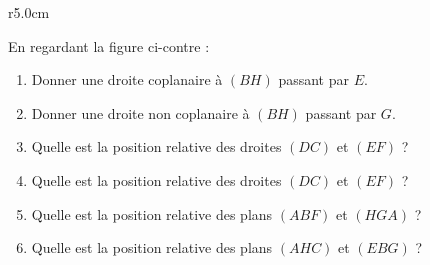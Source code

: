 
\begin{exercice}\label{exosmath-0079}

\begin{wrapfigure}{r}{5.0cm}
    \vspace{-0.5cm}
                \centering
                    
                \end{wrapfigure}

                En regardant la figure ci-contre :
        \begin{enumerate}
            \item
        Donner une droite coplanaire à \( (BH)\) passant par \( E\).
    \item
        Donner une droite non coplanaire à \( (BH)\) passant par \( G\).
    \item
        Quelle est la position relative des droites \( (DC)\) et \( (EF)\) ?
    \item
        Quelle est la position relative des droites \( (DC)\) et \( (EF)\) ?
    \item
        Quelle est la position relative des plans \( (ABF)\) et \( (HGA)\) ?
    \item
        Quelle est la position relative des plans \( (AHC)\) et \( (EBG)\) ?
                
        \end{enumerate}

\end{exercice}
